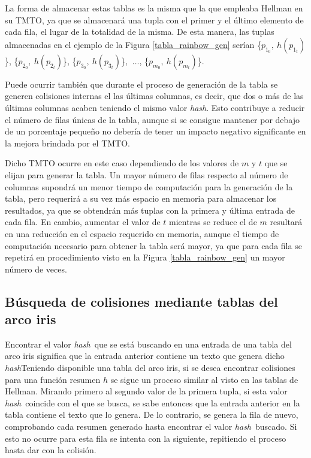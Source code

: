 \documentclass[12pt,spanish,listoffigures,listoftables,listofalgorithms]{tfgetsinf}
\newcommand{\hash}{\textit{hash}}
\begin{document}
La forma de almacenar estas tablas es la misma que la que empleaba Hellman en su TMTO, ya que se almacenará una tupla con el primer y el último elemento de cada fila, el lugar de la totalidad de la misma. De esta manera, las tuplas almacenadas en el ejemplo de la Figura \ref{tabla_rainbow_gen} serían \{$p_{1_0},~h(p_{1_t})$\}, \{$p_{2_0},~h(p_{2_t})$\}, \{$p_{3_0},~h(p_{3_t})$\}, $~\dots$, \{$p_{m_0},~h(p_{m_t})$\}.

Puede ocurrir también que durante el proceso de generación de la tabla se generen colisiones internas el las últimas columnas, es decir, que dos o más de las últimas columnas acaben teniendo el mismo valor \hash. Esto contribuye a reducir el número de filas únicas de la tabla, aunque si se consigue mantener por debajo de un porcentaje pequeño no debería de tener un impacto negativo significante en la mejora brindada por el TMTO.

Dicho TMTO ocurre en este caso dependiendo de los valores de $m$ y $t$ que se elijan para generar la tabla. Un mayor número de filas respecto al número de columnas supondrá un menor tiempo de computación para la generación de la tabla, pero requerirá a su vez más espacio en memoria para almacenar los resultados, ya que se obtendrán más tuplas con la primera y última entrada de cada fila. En cambio, aumentar el valor de $t$ mientras se reduce el de $m$ resultará en una reducción en el espacio requerido en memoria, aunque el tiempo de computación necesario para obtener la tabla será mayor, ya que para cada fila se repetirá en procedimiento visto en la Figura \ref{tabla_rainbow_gen} un mayor número de veces. 

\subsection{Búsqueda de colisiones mediante tablas del arco iris}

Encontrar el valor \hash~que se está buscando en una entrada de una tabla del arco iris significa que la entrada anterior contiene un texto que genera dicho \hash Teniendo disponible una tabla del arco iris, si se desea encontrar colisiones para una función resumen $h$ se sigue un proceso similar al visto en las tablas de Hellman. Mirando primero al segundo valor de la primera tupla, si esta valor \hash~coincide con el que se busca, se sabe entonces que la entrada anterior en la tabla contiene el texto que lo genera. De lo contrario, se genera la fila de nuevo, comprobando cada resumen generado hasta encontrar el valor \hash~buscado. Si esto no ocurre para esta fila se intenta con la siguiente, repitiendo el proceso hasta dar con la colisión.
\end{document}
